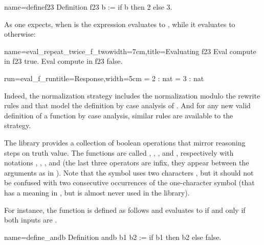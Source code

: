 \begin{coq}{name=definef23}{}
Definition f23 b := if b then 2 else 3.
\end{coq}

As one expects, when  is  the expression
 evaluates to , while it evaluates to  otherwise:

\begin{coq}{name=eval_repeat_twice_f_two}{width=7cm,title=Evaluating f23}
Eval compute in f23 true.
Eval compute in f23 false.
\end{coq}
\begin{coqout}{run=eval_f_run}{title=Response,width=5cm}
  = 2 : nat
  = 3 : nat
\end{coqout}

Indeed, the  normalization strategy includes the
normalization modulo the rewrite rules
 and  that
model the definition by case analysis of . And for any new
valid definition of a function by case analysis, similar rules are
available to the  strategy.

The \mcbMC{} library provides a collection of boolean operations that
mirror reasoning steps on truth value.  The functions are called
, ,  , and , respectively with notations
\C{\~\~},  \C{||}, \C{&&}, and \C{==>} (the last three operators are
infix, they appear between the arguments as in ).
  Note that the symbol \C{\~\~} uses two characters \C{\~}, but it should
not be confused with two consecutive occurrences of the one-character symbol
\C{\~} (that has a meaning in \Coq{}, but is almost never used
in the \mcbMC{} library).

For instance, the function  is defined as follows and
evaluates to  if and only if both inputs are .

\begin{coq}{name=define_andb}{}
Definition andb b1 b2 := if b1 then b2 else false.
\end{coq}


